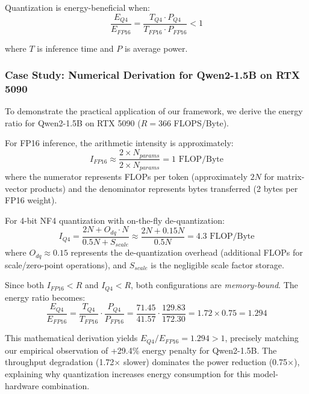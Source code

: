 \documentclass[11pt]{article}
\begin{document}
Quantization is energy-beneficial when:
\begin{equation}
\frac{E_{Q4}}{E_{FP16}} = \frac{T_{Q4} \cdot P_{Q4}}{T_{FP16} \cdot P_{FP16}} < 1
\end{equation}

where $T$ is inference time and $P$ is average power.

\subsubsection{Case Study: Numerical Derivation for Qwen2-1.5B on RTX 5090}

To demonstrate the practical application of our framework, we derive the energy ratio for Qwen2-1.5B on RTX 5090 ($R = 366$ FLOPS/Byte).

For FP16 inference, the arithmetic intensity is approximately:
\begin{equation}
I_{FP16} \approx \frac{2 \times N_{params}}{2 \times N_{params}} = 1 \text{ FLOP/Byte}
\end{equation}
where the numerator represents FLOPs per token (approximately $2N$ for matrix-vector products) and the denominator represents bytes transferred (2 bytes per FP16 weight).

For 4-bit NF4 quantization with on-the-fly de-quantization:
\begin{equation}
I_{Q4} = \frac{2N + O_{dq} \cdot N}{0.5N + S_{scale}} \approx \frac{2N + 0.15N}{0.5N} = 4.3 \text{ FLOP/Byte}
\end{equation}
where $O_{dq} \approx 0.15$ represents the de-quantization overhead (additional FLOPs for scale/zero-point operations), and $S_{scale}$ is the negligible scale factor storage.

Since both $I_{FP16} < R$ and $I_{Q4} < R$, both configurations are \textit{memory-bound}. The energy ratio becomes:
\begin{equation}
\frac{E_{Q4}}{E_{FP16}} = \frac{T_{Q4}}{T_{FP16}} \cdot \frac{P_{Q4}}{P_{FP16}} = \frac{71.45}{41.57} \cdot \frac{129.83}{172.30} = 1.72 \times 0.75 = 1.294
\end{equation}

This mathematical derivation yields $E_{Q4}/E_{FP16} = 1.294 > 1$, precisely matching our empirical observation of +29.4\% energy penalty for Qwen2-1.5B. The throughput degradation (1.72$\times$ slower) dominates the power reduction (0.75$\times$), explaining why quantization increases energy consumption for this model-hardware combination.
\end{document}
